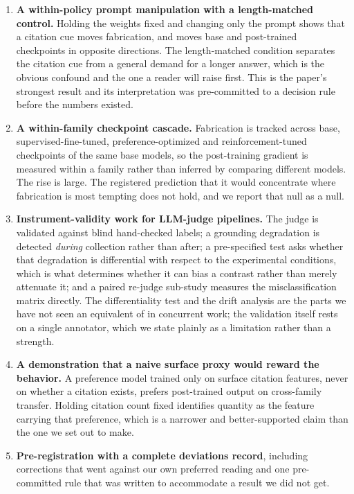 \begin{enumerate}
\item \textbf{A within-policy prompt manipulation with a length-matched control.}
Holding the weights fixed and changing only the prompt shows that a citation cue
moves fabrication, and moves base and post-trained checkpoints in opposite
directions. The length-matched condition separates the citation cue from a
general demand for a longer answer, which is the obvious confound and the one a
reader will raise first. This is the paper's strongest result and its
interpretation was pre-committed to a decision rule before the numbers existed.

\item \textbf{A within-family checkpoint cascade.} Fabrication is tracked across
base, supervised-fine-tuned, preference-optimized and reinforcement-tuned
checkpoints of the same base models, so the post-training gradient is measured
within a family rather than inferred by comparing different models. The rise is
large. The registered prediction that it would concentrate where fabrication is
most tempting does not hold, and we report that null as a null.

\item \textbf{Instrument-validity work for LLM-judge pipelines.} The judge is
validated against blind hand-checked labels; a grounding degradation is detected
\emph{during} collection rather than after; a pre-specified test asks whether
that degradation is differential with respect to the experimental conditions,
which is what determines whether it can bias a contrast rather than merely
attenuate it; and a paired re-judge sub-study measures the misclassification
matrix directly. The differentiality test and the drift analysis are the parts we
have not seen an equivalent of in concurrent work; the validation itself rests on
a single annotator, which we state plainly as a limitation rather than a strength.

\item \textbf{A demonstration that a naive surface proxy would reward the
behavior.} A preference model trained only on surface citation features, never on
whether a citation exists, prefers post-trained output on cross-family transfer.
Holding citation count fixed identifies quantity as the feature carrying that
preference, which is a narrower and better-supported claim than the one we set
out to make.

\item \textbf{Pre-registration with a complete deviations record}, including
corrections that went against our own preferred reading and one pre-committed
rule that was written to accommodate a result we did not get.
\end{enumerate}

